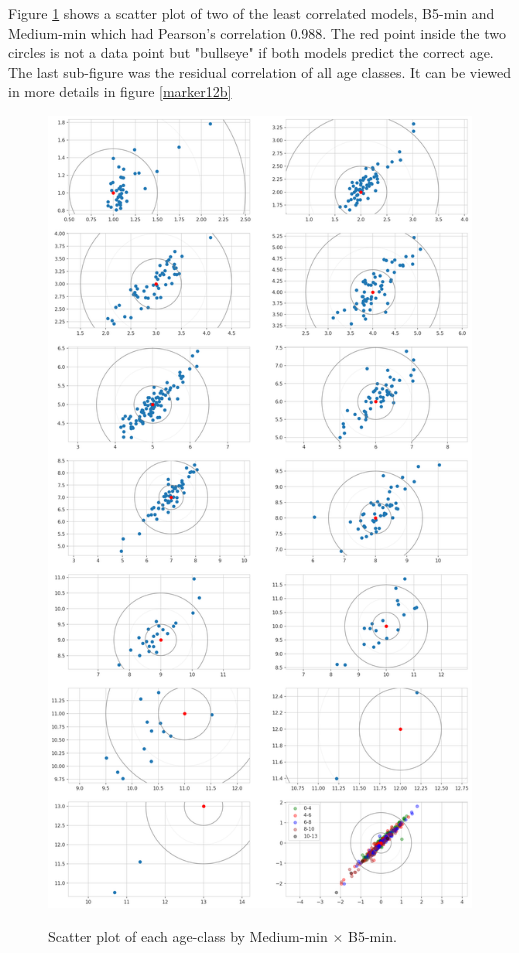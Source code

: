 \documentclass[10pt,letterpaper]{article}
\begin{document}
Figure \ref{marker12} shows a scatter plot of two of the least correlated models, B5-min and Medium-min which had Pearson's correlation 0.988. The red point inside the two circles is not a data point but "bullseye" if both models predict the correct age. The last sub-figure was the residual correlation of all age classes. It can be viewed in more details in figure \ref{marker12b}
\begin{figure}[h!]
  \caption{Scatter plot of each age-class by Medium-min $\times$ B5-min.}
  \centering
  \includegraphics[scale=0.35]{results/eda/m_min_x_b5_min.png}
  \label{marker12}
\end{figure}
\end{document}
